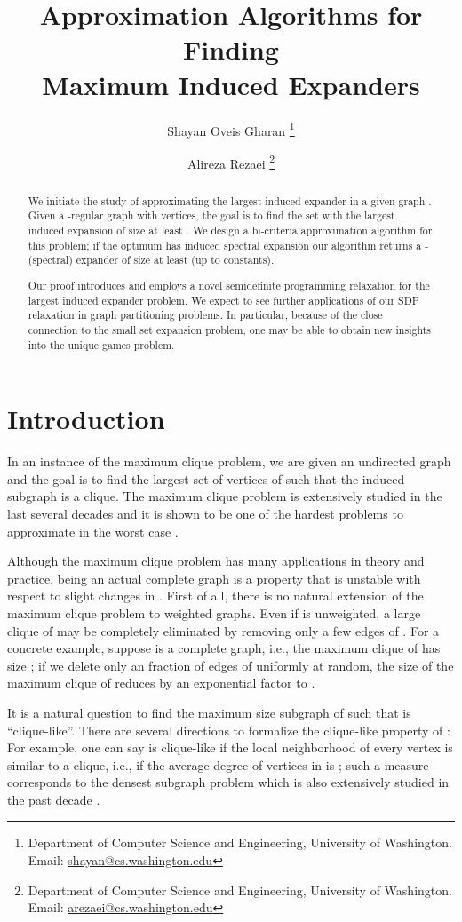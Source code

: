 \documentclass[11pt]{article}
\title{Approximation Algorithms for Finding\\ Maximum  Induced Expanders}
\author{
Shayan Oveis Gharan
\thanks{Department of Computer Science and Engineering, University of Washington.
Email: \protect\url{shayan@cs.washington.edu}}
\and
Alireza Rezaei
\thanks{Department of Computer Science and Engineering, University of Washington.
Email: \protect\url{arezaei@cs.washington.edu}}
}
\begin{document}
\maketitle

\begin{abstract}
	We initiate the study of approximating the largest induced expander in a given graph . Given a -regular graph  with  vertices, the goal is to find the set with the largest induced expansion of size at least . We design a bi-criteria approximation algorithm for this problem; if the optimum has induced spectral expansion  our algorithm returns a -(spectral) expander of size at least  (up to constants).

	Our proof introduces and employs a novel semidefinite programming relaxation for the largest induced expander problem. We expect to see further applications of our SDP relaxation in  graph partitioning problems. In particular, because of the close connection to the small set expansion problem, one may be able to obtain new insights into the unique games problem.
\end{abstract}







\section{Introduction}
In an instance of the maximum clique problem, we are given an undirected graph  and the goal is to find the largest set  of vertices of  such that the induced subgraph  is a clique. The maximum clique problem is extensively studied in the last several decades and it is shown to be one of the hardest problems to approximate in the worst case \cite{Has96}.  

Although the maximum clique problem has many applications in theory and practice,   being an actual complete graph is a property that is  unstable with respect to slight changes in . First of all, there is no natural extension of the maximum clique problem to weighted graphs. Even if  is unweighted, a large clique of  may be completely eliminated by removing only a few edges of .  For a concrete example, suppose  is a complete graph, i.e., the maximum clique of  has size ; if we delete only an  fraction of edges of  uniformly at random, the size of the maximum clique of  reduces by an exponential factor to  \cite{GM75,BE76}. 

It is a natural question to find the maximum size subgraph of  such that  is ``clique-like''. There are several directions to formalize the clique-like property of : For example, one can say  is clique-like if the local neighborhood of every vertex is similar to a clique, i.e., if the average degree of vertices in  is ; such a measure corresponds to the densest subgraph problem which is also extensively studied in the past decade \cite{Cha00,Fei02,Kho04,BCCFV10}.
\end{document}
